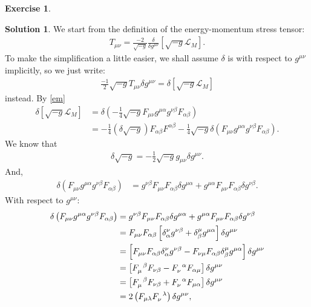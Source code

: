 \documentclass{book}
\numberwithin{equation}{section}
\theoremstyle{definition}
\newtheorem{exmp}{Exercise}[section]
\newtheorem{sln}{Solution}[section]
\newcommand{\lag}{\mathcal{L}}
\newcommand{\nn}{\nonumber}
\newcommand{\f}[2]{\frac{#1}{#2}}
\newcommand{\lp}{\left(}
\newcommand{\rp}{\right)}
\newcommand{\lb}{\left[}
\newcommand{\rb}{\right]}
\begin{document}
\begin{exmp}
	\begin{sln}
		We start from the definition of the energy-momentum stress tensor:
		\begin{align}
		T_{\mu\nu} = \f{-2}{\sqrt{-g}}\f{\delta}{\delta g^{\mu\nu}} \lb \sqrt{-g}\lag_M \rb.
		\end{align}
		To make the simplification a little easier, we shall assume $\delta$ is with respect to $g^{\mu\nu}$ implicitly, so we just write:
		\begin{align}
		\f{-1}{2}\sqrt{-g}T_{\mu\nu}\delta g^{\mu\nu} = \delta\lb \sqrt{-g}\lag_M \rb
		\end{align}
		instead. By \eqref{em}
		\begin{align}
		\delta\lb \sqrt{-g}\lag_M \rb &= \delta \lp  -\f{1}{4}\sqrt{-g}F_{\mu\nu}g^{\mu\alpha}g^{\nu\beta}F_{\alpha\beta} \rp \nn\\
		&= -\f{1}{4}(\delta \sqrt{-g})F_{\alpha\beta}F^{\alpha\beta} -\f{1}{4}\sqrt{-g}\delta\lp F_{\mu\nu}g^{\mu\alpha}g^{\nu\beta}F_{\alpha\beta} \rp.
		\end{align}
		We know that
		\begin{align}
		\delta \sqrt{-g} = -\f{1}{2}\sqrt{-g} g_{\mu\nu}\delta g^{\mu\nu}.
		\end{align}
		And,
		\begin{align}
		\delta \lp F_{\mu\nu}g^{\mu\alpha}g^{\nu\beta}F_{\alpha\beta} \rp &= g^{\nu\beta}F_{\mu\nu}F_{\alpha\beta}\delta g^{\mu\alpha} + g^{\mu\alpha}F_{\mu\nu}F_{\alpha\beta}\delta g^{\nu\beta}.
		\end{align}
		With respect to $g^{\mu\nu}$:
		\begin{align}
		\delta \lp F_{\mu\nu}g^{\mu\alpha}g^{\nu\beta}F_{\alpha\beta} \rp
		&= g^{\nu\beta}F_{\mu\nu}F_{\alpha\beta}\delta g^{\mu\alpha} + g^{\mu\alpha}F_{\mu\nu}F_{\alpha\beta}\delta g^{\nu\beta}\nn\\
		&= F_{\mu\nu}F_{\alpha\beta}\lb \delta ^\nu_\alpha g^{\nu\beta} + \delta^\mu_\beta g^{\mu\alpha} \rb \delta g^{\mu\nu}\nn\\
		&= \lb F_{\mu\nu}F_{\alpha\beta}\delta^\nu_\alpha g^{\nu\beta} - F_{\nu\mu}F_{\alpha\beta}\delta^\mu_\beta g^{\mu\alpha} \rb\delta g^{\mu\nu}\nn\\
		&= \lb \tensor{F}{_\mu^\beta}F_{\nu\beta} - \tensor{F}{_\nu^\alpha}F_{\alpha\mu} \rb\delta g^{\mu\nu}\nn\\
		&= \lb \tensor{F}{_\mu^\beta}F_{\nu\beta} + \tensor{F}{_\nu^\alpha}F_{\mu\alpha} \rb\delta g^{\mu\nu}\nn\\
		&= 2\lp F_{\mu\lambda} \tensor{F}{_\nu^\lambda} \rp \delta g^{\mu\nu},

\end{align}
\end{sln}
\end{exmp}
\end{document}

